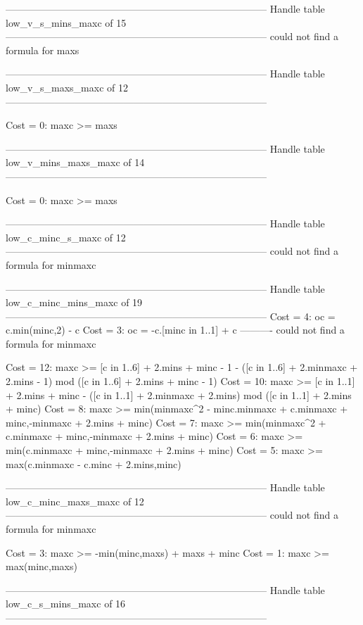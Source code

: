 --------------------------------------------------------------------------------
Handle table low_v_s_mins_maxc of 15
--------------------------------------------------------------------------------
could not find a formula for maxs


--------------------------------------------------------------------------------
Handle table low_v_s_maxs_maxc of 12
--------------------------------------------------------------------------------

Cost =  0:  maxc >= maxs

--------------------------------------------------------------------------------
Handle table low_v_mins_maxs_maxc of 14
--------------------------------------------------------------------------------

Cost =  0:  maxc >= maxs

--------------------------------------------------------------------------------
Handle table low_c_minc_s_maxc of 12
--------------------------------------------------------------------------------
could not find a formula for minmaxc


--------------------------------------------------------------------------------
Handle table low_c_minc_mins_maxc of 19
--------------------------------------------------------------------------------
Cost =  4:  oc      = c.min(minc,2) - c
Cost =  3:  oc      = -c.[minc in 1..1] + c
----------
could not find a formula for minmaxc

Cost = 12:  maxc >= [c in 1..6] + 2.mins + minc - 1 - ([c in 1..6] + 2.minmaxc + 2.mins - 1) mod ([c in 1..6] + 2.mins + minc - 1)
Cost = 10:  maxc >= [c in 1..1] + 2.mins + minc - ([c in 1..1] + 2.minmaxc + 2.mins) mod ([c in 1..1] + 2.mins + minc)
Cost =  8:  maxc >= min(minmaxc^2 - minc.minmaxc + c.minmaxc + minc,-minmaxc + 2.mins + minc)
Cost =  7:  maxc >= min(minmaxc^2 + c.minmaxc + minc,-minmaxc + 2.mins + minc)
Cost =  6:  maxc >= min(c.minmaxc + minc,-minmaxc + 2.mins + minc)
Cost =  5:  maxc >= max(c.minmaxc - c.minc + 2.mins,minc)

--------------------------------------------------------------------------------
Handle table low_c_minc_maxs_maxc of 12
--------------------------------------------------------------------------------
could not find a formula for minmaxc

Cost =  3:  maxc >= -min(minc,maxs) + maxs + minc
Cost =  1:  maxc >= max(minc,maxs)

--------------------------------------------------------------------------------
Handle table low_c_s_mins_maxc of 16
--------------------------------------------------------------------------------

